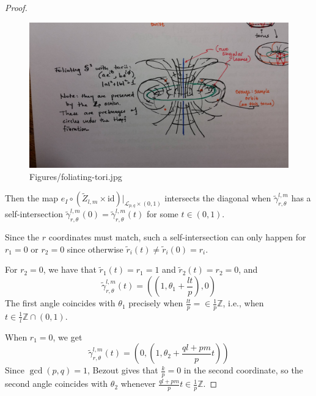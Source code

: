 \documentclass[reqno]{amsart}
\theoremstyle{definition}
\theoremstyle{remark}
\newcommand{\id}{{\mathrm{id}}}
\begin{document}
\begin{proof}
    \begin{figure}[htpb]
        \centering
        \includegraphics[width=1\textwidth]{Figures/foliating-tori.jpg}
        \caption{Figures/foliating-tori.jpg}
        \label{fig:Figures-foliating-tori-jpg}
    \end{figure}








    Then the map $e_I \circ \left( \tilde{Z}_{l,m}\times \id \right) 
    |_{\mathcal{L}_{p,q} \times  (0,1)}$ intersects
    the diagonal when $\tilde{\gamma}_{r,\theta}^{l,m}$ has a 
    self-intersection $\tilde{\gamma}_{r, \theta}^{l,m}(0)=
    \tilde{\gamma}_{r,\theta}^{l,m}(t)$ for
    some $t \in (0,1)$.


    Since the $r$ coordinates must match, such a self-intersection can
    only happen for $ r_1 = 0$
    or $r_2 = 0$ since otherwise
    $\tilde{r}_i(t) \neq \tilde{r}_i(0) = r_i$.

    For $r_2 = 0$, we have that
    $\tilde{r}_1(t) = r_1 = 1$ and
    $\tilde{r}_2 (t) = r_2 = 0$, and
    \[
    \tilde{\gamma}_{r, \theta}^{l,m} (t) = 
    \left( \left( 1, \theta_1 + \frac{lt}{p} \right) , 0 \right) 
    \] 
    The first angle coincides with
    $\theta_1$ precisely when
    $\frac{lt}{p} = \in \frac{1}{p}\mathbb{Z}$, i.e., when
    $t \in \frac{1}{l} \mathbb{Z} \cap (0,1)$.

    When $r_1 = 0$, we get
    \[
    \tilde{\gamma}_{r, \theta}^{l,m}(t) = 
    \left( 0, \left( 1, \theta_2 + \frac{ql+pm}{p}t \right)  \right) 
    \] 
    Since $\gcd (p,q) = 1$, Bezout gives that
    $ \frac{k}{p} = 0$ in the second coordinate, so 
     the second angle coincides with $\theta_2$ whenever
     $\frac{ql+pm}{p}t \in \frac{1}{p} \mathbb{Z}$.


\end{proof}
\end{document}

